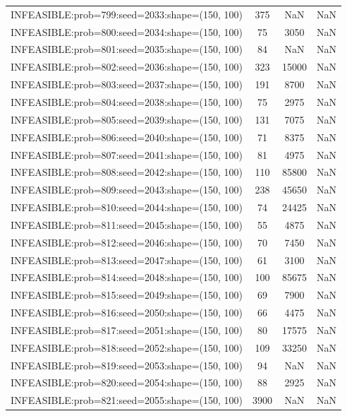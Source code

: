 \begin{longtable}{lccc}
INFEASIBLE:prob=799:seed=2033:shape=(150, 100) &   375 &   NaN &    NaN \\
INFEASIBLE:prob=800:seed=2034:shape=(150, 100) &    75 &  3050 &    NaN \\
INFEASIBLE:prob=801:seed=2035:shape=(150, 100) &    84 &   NaN &    NaN \\
INFEASIBLE:prob=802:seed=2036:shape=(150, 100) &   323 & 15000 &    NaN \\
INFEASIBLE:prob=803:seed=2037:shape=(150, 100) &   191 &  8700 &    NaN \\
INFEASIBLE:prob=804:seed=2038:shape=(150, 100) &    75 &  2975 &    NaN \\
INFEASIBLE:prob=805:seed=2039:shape=(150, 100) &   131 &  7075 &    NaN \\
INFEASIBLE:prob=806:seed=2040:shape=(150, 100) &    71 &  8375 &    NaN \\
INFEASIBLE:prob=807:seed=2041:shape=(150, 100) &    81 &  4975 &    NaN \\
INFEASIBLE:prob=808:seed=2042:shape=(150, 100) &   110 & 85800 &    NaN \\
INFEASIBLE:prob=809:seed=2043:shape=(150, 100) &   238 & 45650 &    NaN \\
INFEASIBLE:prob=810:seed=2044:shape=(150, 100) &    74 & 24425 &    NaN \\
INFEASIBLE:prob=811:seed=2045:shape=(150, 100) &    55 &  4875 &    NaN \\
INFEASIBLE:prob=812:seed=2046:shape=(150, 100) &    70 &  7450 &    NaN \\
INFEASIBLE:prob=813:seed=2047:shape=(150, 100) &    61 &  3100 &    NaN \\
INFEASIBLE:prob=814:seed=2048:shape=(150, 100) &   100 & 85675 &    NaN \\
INFEASIBLE:prob=815:seed=2049:shape=(150, 100) &    69 &  7900 &    NaN \\
INFEASIBLE:prob=816:seed=2050:shape=(150, 100) &    66 &  4475 &    NaN \\
INFEASIBLE:prob=817:seed=2051:shape=(150, 100) &    80 & 17575 &    NaN \\
INFEASIBLE:prob=818:seed=2052:shape=(150, 100) &   109 & 33250 &    NaN \\
INFEASIBLE:prob=819:seed=2053:shape=(150, 100) &    94 &   NaN &    NaN \\
INFEASIBLE:prob=820:seed=2054:shape=(150, 100) &    88 &  2925 &    NaN \\
INFEASIBLE:prob=821:seed=2055:shape=(150, 100) &  3900 &   NaN &    NaN \\

\end{longtable}
